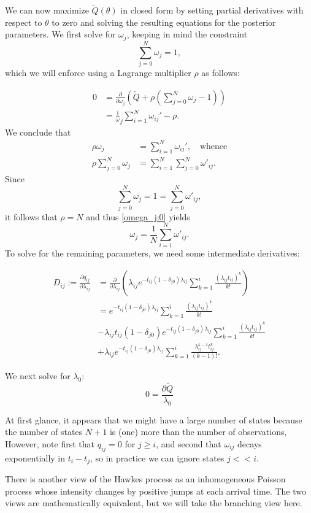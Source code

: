 \documentclass[12pt,leqno]{article}
\begin{document}
We can now maximize $\tilde{Q}(\theta)$ in closed form by setting partial derivatives with respect to $\theta$ to
zero and solving the resulting equations for the posterior parameters.  We first solve for $\omega_j$, keeping in
mind the constraint
$$
\sum_{j=0}^N\omega_j = 1,
$$
which we will enforce using a Lagrange multiplier $\rho$ as follows:

\begin{align*}
  0 &= \frac{\partial}{\partial\omega_j}\left(\tilde{Q} + \rho(\sum_{j=0}^N\omega_j - 1)\right) \\
  &= \frac{1}\omega_j\sum_{i=1}^N\omega_{ij}' - \rho.
\end{align*}
We conclude that
\begin{equation}\label{omega_j:0}
  \begin{split}
  \rho\omega_j &= \sum_{i=1}^N\omega_{ij}',\quad\text{whence} \\
  \rho\sum_{j=0}^N\omega_j &= \sum_{i=1}^N\sum_{j=0}^N\omega'_{ij}.
  \end{split}
\end{equation}
Since
$$
\sum_{j=0}^N \omega_j = 1 = \sum_{j=0}^N\omega'_{ij},
$$
it follows that $\rho = N$ and thus \eqref{omega_j:0} yields
\begin{equation}\label{omega_j}
  \omega_j = \frac{1}{N}\sum_{i=1}^N\omega'_{ij}.
\end{equation}
To solve for the remaining parameters, we need some intermediate derivatives:

\begin{align*}
  D_{ij} := \frac{\partial{q_{ij}}}{\partial\lambda_{ij}} &= \frac{\partial}{\partial\lambda_{ij}}\left(\lambda_{ij}e^{-t_{ij}(1-\delta_{j0})\lambda_{ij}}\sum_{k=1}^i\frac{(\lambda_{ij}t_{ij})^k}{k!}\right)\\
  &= e^{-t_{ij}(1-\delta_{j0})\lambda_{ij}}\sum_{k=1}^i\frac{(\lambda_{ij}t_{ij})^k}{k!}\\
  &-\lambda_{ij}t_{ij}(1-\delta_{j0})e^{-t_{ij}(1-\delta_{j0})\lambda_{ij}}\sum_{k=1}^i\frac{(\lambda_{ij}t_{ij})^k}{k!}\\
  &+\lambda_{ij}e^{-t_{ij}(1-\delta_{j0})\lambda_{ij}}\sum_{k=1}^i\frac{\lambda_{ij}^{k-1}t_{ij}^k}{(k-1)!}.
\end{align*}

We next solve for $\lambda_0$:
$$
0 = \frac{\partial\tilde{Q}}{\lambda_0}
$$
  
  
  

At first glance, it appears that we might have a large number of states because the number of states $N+1$ is (one) more than the number of observations,  However, note first that $q_{ij} = 0$ for $j \ge i$, and second that
$\omega_{ij}$ decays exponentially in $t_i-t_j$, so in practice we can ignore
states $j << i$.

There is another view of the Hawkes process as an inhomogeneous Poisson process whose intensity changes by positive
jumps at each arrival time.  The two views are mathematically equivalent, but we will take the branching view here.

 
\end{document}
